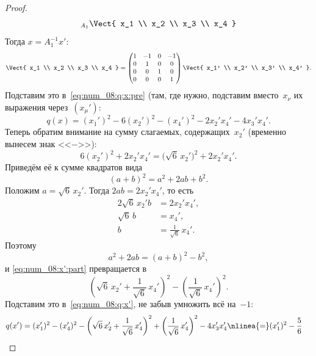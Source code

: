 \begin{proof}
\begin{align*}
{		}_{A_1}
		\Vect{
			x_1 \\ x_2 \\ x_3 \\ x_4
		}
	\end{align*}
	Тогда $x = A_1^{-1} x'$:
	\[
		\Vect{
			x_1 \\ x_2 \\ x_3 \\ x_4
		}
		=
		\begin{pmatrix}
			1 & -1 & 0 & -1
			\\
			0 & 1 & 0 & 0
			\\
			0 & 0 & 1 & 0
			\\
			0 & 0 & 0 & 1
		\end{pmatrix}
		\Vect{
			x_1' \\ x_2' \\ x_3' \\ x_4'
		}
		.
	\]
	Подставим это в~\eqref{eq:num_08:q:x:pre} (там, где нужно, подставим вместо~$x_\nu$ их выражения через~$(x_\mu')$:
	\begin{equation}
		\label{eq:num_08:q:x'}
		q(x) =
		(x_1')^2
		- 6(x_2')^2
		- (x_4')^2
		-
		2 x_2' x_4'
		-
		4 x_3' x_4'
		.
	\end{equation}
	Теперь обратим внимание на сумму слагаемых, содержащих~$x_2'$ (временно вынесем знак <<$-$>>):
	\begin{equation}
		\label{eq:num_08:x':part}
		6(x_2')^2 + 2x_2'x_4'
		=
		\bigl( \sqrt{6}\,x_2' \bigr)^2 + 2x_2'x_4'
		.
	\end{equation}
	Приведём её к сумме квадратов вида
	\[
		(a+b)^2 = a^2 + 2ab + b^2
		.
	\]
	Положим $a = \sqrt{6}\,x_2'$. Тогда $2ab = 2x_2' x_4'$, то есть
	\begin{align*}
		2\sqrt{6}\,x_2' b &= 2x_2' x_4'
		,
		\\
		\sqrt{6}\, b &= x_4'
		,
		\\
		b &= \frac{1}{\sqrt{6}}\,x_4'
		.
	\end{align*}
	Поэтому
	\[
		a^2 + 2ab = (a+b)^2 - b^2
		,
	\]
	и \eqref{eq:num_08:x':part} превращается в
	\[
		\left( 
			\sqrt{6}\,x_2' +
			\frac{1}{\sqrt{6}}\,x_4'
		\right)^2
		-
		\left( 
			\frac{1}{\sqrt{6}}\,x_4'
		\right)^2
		.
	\]
	Подставим это в~\eqref{eq:num_08:q:x'}, не забыв умножить всё на~$-1$:
	\begin{align*}
		q(x') &=
		(x_1')^2
		- (x_4')^2
		-
		\left( 
			\sqrt{6}\,x_2' +
			\frac{1}{\sqrt{6}}\,x_4'
		\right)^2
		+
		\left( 
			\frac{1}{\sqrt{6}}\,
			x_4'
		\right)^2
		-
		4 x_3' x_4'
		\nlinea{=}
		(x_1')^2
		- 
		\frac{5}{6}\,

\end{align*}
\end{proof}
